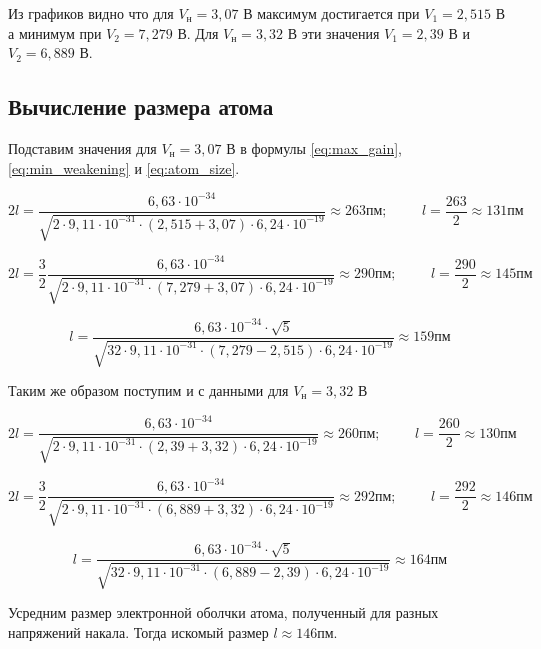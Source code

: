 \documentclass[12pt]{article}
\begin{document}
      Из графиков видно что для $V_н = 3,07$ В максимум достигается при $V_1 = 2,515$ В а минимум при $V_2 = 7,279$ В.
      Для $V_н = 3,32$ В эти значения $V_1 = 2,39$ В и $V_2 = 6,889$ В.

    \subsection{Вычисление размера атома}

      Подставим значения для $V_н = 3,07$ В в формулы \ref{eq:max_gain}, \ref{eq:min_weakening} и \ref{eq:atom_size}.

      $$
        2 l = \frac{6,63 \cdot 10^{-34}}{\sqrt{2 \cdot 9,11 \cdot 10^{-31} \cdot \left( 2,515 + 3,07 \right) \cdot 6,24 \cdot 10^{-19}}} \approx 263 пм; \hspace{1cm}
        l = \frac{263}{2} \approx 131 пм
      $$

      $$
        2 l = \frac{3}{2} \frac{6,63 \cdot 10^{-34}}{\sqrt{2 \cdot 9,11 \cdot 10^{-31} \cdot \left( 7,279 + 3,07 \right) \cdot 6,24 \cdot 10^{-19}}} \approx 290 пм; \hspace{1cm}
        l = \frac{290}{2} \approx 145 пм
      $$

      $$
        l = \frac{6,63 \cdot 10^{-34} \cdot \sqrt{5}}{\sqrt{32 \cdot 9,11 \cdot 10^{-31} \cdot \left( 7,279 - 2,515 \right) \cdot 6,24 \cdot 10^{-19}}} \approx 159 пм
      $$

      Таким же образом поступим и с данными для $V_н = 3,32$ В

      $$
        2 l = \frac{6,63 \cdot 10^{-34}}{\sqrt{2 \cdot 9,11 \cdot 10^{-31} \cdot \left( 2,39 + 3,32 \right) \cdot 6,24 \cdot 10^{-19}}} \approx 260 пм; \hspace{1cm}
        l = \frac{260}{2} \approx 130 пм
      $$

      $$
        2 l = \frac{3}{2} \frac{6,63 \cdot 10^{-34}}{\sqrt{2 \cdot 9,11 \cdot 10^{-31} \cdot \left( 6,889 + 3,32 \right) \cdot 6,24 \cdot 10^{-19}}} \approx 292 пм; \hspace{1cm}
        l = \frac{292}{2} \approx 146 пм
      $$

      $$
        l = \frac{6,63 \cdot 10^{-34} \cdot \sqrt{5}}{\sqrt{32 \cdot 9,11 \cdot 10^{-31} \cdot \left( 6,889 - 2,39 \right) \cdot 6,24 \cdot 10^{-19}}} \approx 164 пм
      $$

      Усредним размер электронной оболчки атома, полученный для разных
      напряжений накала. Тогда искомый размер $l \approx 146 пм$.
\end{document}
